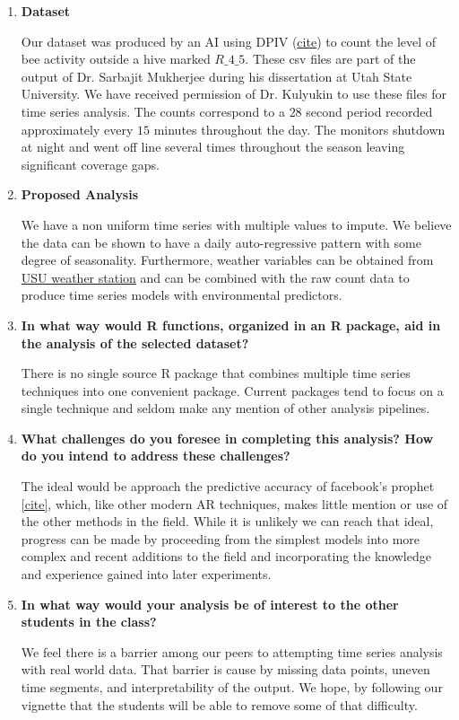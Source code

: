 \documentclass[12pt]{report}
\begin{document}
\begin{enumerate}
\item {\bf Dataset}

Our dataset was produced by an AI using DPIV (\href{https://www.researchgate.net/figure/Directional-DPIV-based-bee-motion-estimation-algorithm_fig1_340021624}{cite}) to count the level of bee activity outside a hive marked $R\_4\_5$. These csv files are part of the output of Dr. Sarbajit Mukherjee during his dissertation at Utah State University. We have received permission of Dr. Kulyukin to use these files for time series analysis. The counts correspond to a $28$ second period recorded approximately every $15$ minutes throughout the day. The monitors shutdown at night and went off line several times throughout the season leaving significant coverage gaps.

\item {\bf Proposed Analysis}

We have a non uniform time series with multiple values to impute. We believe the data can be shown to have a daily auto-regressive pattern with some degree of seasonality. Furthermore, weather variables can be obtained from \href{https://climate.usu.edu/mchd/dashboard/dashboard.php?network=USUwx&station=1279257&units=E&showgraph=0&}{USU weather station} and can be combined with the raw count data to produce time series models with environmental predictors.

\item {\bf In what way would R functions, organized in an R package, aid in the analysis of the selected dataset? }

There is no single source R package that combines multiple time series techniques into one convenient package. Current packages tend to focus on a single technique and seldom make any mention of other analysis pipelines.

\item {\bf What challenges do you foresee in completing this analysis? How do you intend to address these challenges? }

The ideal would be approach the predictive accuracy of facebook's prophet \href{https://facebook.github.io/prophet/}{[cite]}, which, like other modern AR techniques, makes little mention or use of the other methods in the field. While it is unlikely we can reach that ideal, progress can be made by proceeding from the simplest models into more complex and recent additions to the field and incorporating the knowledge and experience gained into later experiments.

\item {\bf In what way would your analysis be of interest to the other students in the class? }

We feel there is a barrier among our peers to attempting time series analysis with real world data. That barrier is cause by missing data points, uneven time segments, and interpretability of the output. We hope, by following our vignette that the students will be able to remove some of that difficulty.

\end{enumerate}
\end{document}

